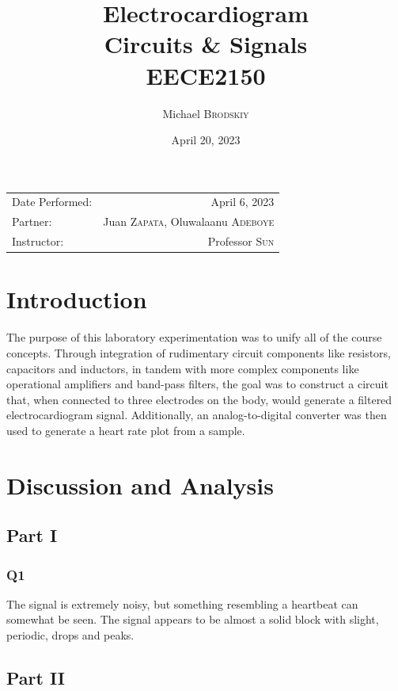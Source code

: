 \documentclass[
	letterpaper, %
	10pt, %
]{CSUniSchoolLabReport}
\title{Electrocardiogram\\ Circuits \& Signals \\ EECE2150} %
\author{Michael \textsc{Brodskiy}}
\date{April 20, 2023} %
\begin{document}
\maketitle %

\begin{center}
	\begin{tabular}{l r}
		Date Performed: & April 6, 2023 \\ %
        Partner: & Juan \textsc{Zapata}, Oluwalaanu \textsc{Adeboye} \\ %
		Instructor: & Professor \textsc{Sun} %
	\end{tabular}
\end{center}

\setcounter{section}{-1}

\section{Introduction}

The purpose of this laboratory experimentation was to unify all of the course concepts. Through integration of rudimentary circuit components like resistors, capacitors and inductors, in tandem with more complex components like operational amplifiers and band-pass filters, the goal was to construct a circuit that, when connected to three electrodes on the body, would generate a filtered electrocardiogram signal. Additionally, an analog-to-digital converter was then used to generate a heart rate plot from a sample.

\section{Discussion and Analysis}

\subsection{Part I}

\subsubsection{Q1} The signal is extremely noisy, but something resembling a heartbeat can somewhat be seen. The signal appears to be almost a solid block with slight, periodic, drops and peaks.

\subsection{Part II}
\end{document}
